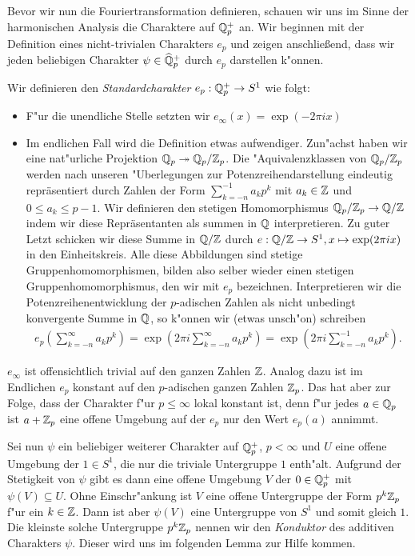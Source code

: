 		
		Bevor wir nun die Fouriertransformation definieren, schauen wir uns im Sinne der harmonischen Analysis die Charaktere auf $\mathbb{Q}_p^+$ an.
		Wir beginnen mit der Definition eines nicht-trivialen Charakters $e_p$ und zeigen anschließend, dass wir jeden beliebigen Charakter $\psi \in \widehat{\mathbb{Q}}_p^+$ durch $e_p$ darstellen k"onnen.
		\begin{defi}
			Wir definieren den \emph{Standardcharakter} $e_p:\mathbb{Q}_p^+ \to S^1$ wie folgt:
			\begin{itemize}%
				\item F"ur die unendliche Stelle setzten wir $e_\infty(x) = \exp(-2\pi i x)$
				\item Im endlichen Fall wird die Definition etwas aufwendiger. Zun"achst haben wir eine nat"urliche Projektion ${\mathbb{Q}_p} \twoheadrightarrow {\mathbb{Q}_p}/{\mathbb{Z}_p}$.
				Die "Aquivalenzklassen von ${\mathbb{Q}_p}/{\mathbb{Z}_p}$ werden nach unseren "Uberlegungen zur Potenzreihendarstellung eindeutig repräsentiert durch Zahlen der Form $\sum_{k=-n}^{-1} a_kp^k$ mit $a_k \in \mathbb{Z}$ und $0\leq a_k\leq p-1$.
				Wir definieren den stetigen Homomorphismus ${\mathbb{Q}_p}/{\mathbb{Z}_p} \to \mathbb{Q}/\mathbb{Z}$ indem wir diese Repräsentanten als summen in $\mathbb{Q}$ interpretieren. 
				Zu guter Letzt schicken wir diese Summe in $\mathbb{Q}/\mathbb{Z}$ durch $e: \mathbb{Q}/\mathbb{Z} \to S^1, x \mapsto \exp(2\pi i x)$ in den Einheitskreis. 
				Alle diese Abbildungen sind stetige Gruppenhomomorphismen, bilden also selber wieder einen stetigen Gruppenhomomorphismus, den wir mit $e_p$ bezeichnen.
				Interpretieren wir die Potenzreihenentwicklung der $p$-adischen Zahlen als nicht unbedingt konvergente Summe in $\mathbb{Q}$, so k"onnen wir (etwas unsch"on) schreiben
				\begin{align*}
					e_p\left(\sum_{k=-n}^{\infty} a_kp^k\right) = \exp\left(2\pi i \sum_{k=-n}^{\infty} a_kp^k\right) = \exp\left(2\pi i \sum_{k=-n}^{-1} a_kp^k\right).
				\end{align*}
			\end{itemize}
		\end{defi}
		$e_\infty$ ist offensichtlich trivial auf den ganzen Zahlen $\mathbb{Z}$. Analog dazu ist im Endlichen $e_p$ konstant auf den $p$-adischen ganzen Zahlen ${\mathbb{Z}_p}$.
		Das hat aber zur Folge, dass der Charakter f"ur $p\leq\infty$ lokal konstant ist, denn f"ur jedes $a \in {\mathbb{Q}_p}$ ist $a+{\mathbb{Z}_p}$ eine offene Umgebung auf der $e_p$ nur den Wert $e_p(a)$ annimmt.
		
		Sei nun $\psi$ ein beliebiger weiterer Charakter auf $\mathbb{Q}_p^+$, $p<\infty$ und $U$ eine offene Umgebung der $1 \in S^1$, die nur die triviale Untergruppe $1$ enth"alt. 
		Aufgrund der Stetigkeit von $\psi$ gibt es dann eine offene Umgebung $V$ der $0\in\mathbb{Q}_p^+$ mit $\psi(V)\subseteq U$. 
		Ohne Einschr"ankung ist $V$ eine offene Untergruppe der Form $p^k{\mathbb{Z}_p}$ f"ur ein $k\in\mathbb{Z}$. 
		Dann ist aber $\psi(V)$ eine Untergruppe von $S^1$ und somit gleich $1$.
		Die kleinste solche Untergruppe $p^k{\mathbb{Z}_p}$ nennen wir den \emph{Konduktor} des additiven Charakters $\psi$.
		Dieser wird uns im folgenden Lemma zur Hilfe kommen.
	
